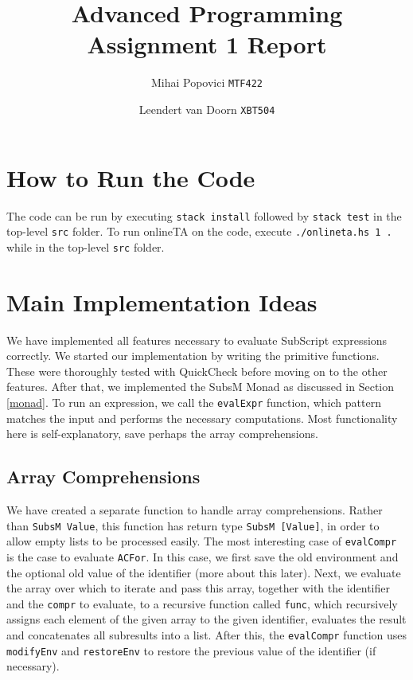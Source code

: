 \documentclass{article}
\title{Advanced Programming Assignment 1 Report}
\author{Mihai Popovici \texttt{MTF422} \and Leendert van Doorn \texttt{XBT504}}
\begin{document}
\maketitle

\section{How to Run the Code}
The code can be run by executing \texttt{stack install} followed by \texttt{stack test} in the top-level \texttt{src} folder. To run onlineTA on the code, execute \mbox{\texttt{./onlineta.hs 1 .}} while in the top-level \texttt{src} folder.

\section{Main Implementation Ideas}		
We have implemented all features necessary to evaluate SubScript expressions correctly. We started our implementation by writing the primitive functions. These were thoroughly tested with QuickCheck before moving on to the other features. After that, we implemented the SubsM Monad as discussed in Section \ref{monad}. To run an expression, we call the \texttt{evalExpr} function, which pattern matches the input and performs the necessary computations. Most functionality here is self-explanatory, save perhaps the array comprehensions. 

\subsection{Array Comprehensions}
We have created a separate function to handle array comprehensions. Rather than \texttt{SubsM Value}, this function has return type \texttt{SubsM [Value]}, in order to allow empty lists to be processed easily. The most interesting case of \texttt{evalCompr} is the case to evaluate \texttt{ACFor}. In this case, we first save the old environment and the optional old value of the identifier (more about this later). Next, we evaluate the array over which to iterate and pass this array, together with the identifier and the \texttt{compr} to evaluate, to a recursive function called \texttt{func}, which recursively assigns each element of the given array to the given identifier, evaluates the result and concatenates all subresults into a list. After this, the \texttt{evalCompr} function uses \texttt{modifyEnv} and \texttt{restoreEnv} to restore the previous value of the identifier (if necessary). 
\end{document}
